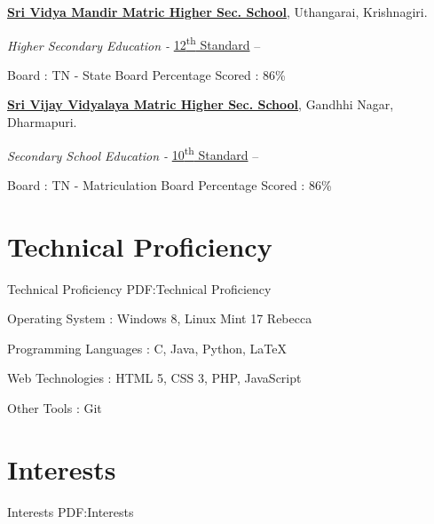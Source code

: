 \documentclass[letterpaper,MMMyyyy,nonstop]{simpleresumecv}
\begin{document}
\begin{body}
\BigGap
\href{https://www.google.co.in/#q=sri+vidya+mandir+uthangarai}
{\textbf{Sri Vidya Mandir Matric Higher Sec. School}},
Uthangarai, Krishnagiri.

\GapNoBreak
\BulletItem
\emph{Higher Secondary Education - }
\href{http://www.example.com/my-department}
{12\textsuperscript{th} Standard}
\hfill
{} --
\begin{detail}
\SubBulletItem
Board : TN - State Board
\SubBulletItem
Percentage Scored : 86\%
\end{detail}

\BigGap
\href{http://www.vijayvidyalaya.com/matric_dhar/}
{\textbf{Sri Vijay Vidyalaya Matric Higher Sec. School}},
Gandhhi Nagar, Dharmapuri.

\GapNoBreak
\BulletItem
\emph {Secondary School Education -}
\href{}
{10\textsuperscript{th} Standard}
\hfill
{} --
\begin{detail}
\SubBulletItem
Board : TN - Matriculation Board
\SubBulletItem
Percentage Scored : 86\%
\end{detail}


\section
{Technical Proficiency}
{Technical Proficiency}
{PDF:Technical Proficiency}

\BulletItem
Operating System : Windows 8, Linux Mint 17 Rebecca 

\GapNoBreak
\BulletItem
Programming Languages : C, Java, Python, {\LaTeX} 

\GapNoBreak
\BulletItem
Web Technologies : HTML 5, CSS 3, PHP, JavaScript 
%

\GapNoBreak
\newline
\BulletItem
Other Tools : Git


\section
{Interests}
{Interests}
{PDF:Interests}


\end{body}
\end{document}
